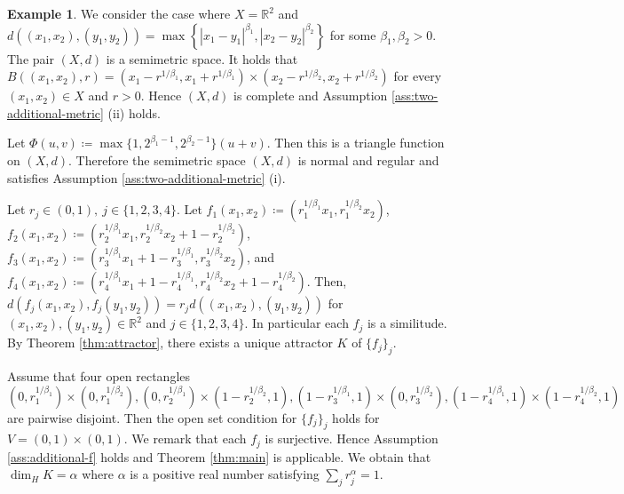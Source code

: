 \documentclass[a4paper, reqno, 11pt]{amsart}
\theoremstyle{definition}
\newtheorem{Exa}[Thm]{Example}
\begin{document}
\begin{Exa}
We consider the case where $X = \mathbb{R}^2$ and $d\left((x_1,x_2), (y_1, y_2)\right) = \max\left\{|x_1 - y_1|^{\beta_1},  |x_2 - y_2|^{\beta_2} \right\}$ for some $\beta_1, \beta_2 > 0$. 
The pair $(X,d)$ is a  semimetric space. 
It holds that $B\left((x_1,x_2),r \right) = \left(x_1-r^{1/\beta_1}, x_1+r^{1/\beta_1}\right) \times \left(x_2 - r^{1/\beta_2}, x_2 + r^{1/\beta_2} \right)$ for every $(x_1, x_2) \in X$ and $r > 0$.  
Hence $(X,d)$ is complete and Assumption \ref{ass:two-additional-metric} (ii) holds. 


Let $\Phi  (u,v) \coloneqq \max\{1,2^{\beta_1 - 1}, 2^{\beta_2 -1}\} (u+v)$. 
Then this is a triangle function on $(X,d)$. 
Therefore the semimetric space $(X,d)$ is normal and regular and satisfies Assumption \ref{ass:two-additional-metric} (i). 

Let $r_j \in (0,1), \ j \in \{1,2,3,4\}$. 
Let $f_1 (x_1, x_2) \coloneqq (r_{1}^{1/\beta_1} x_1, r_{1}^{1/\beta_2} x_2)$, $f_2 (x_1, x_2) \coloneqq (r_{2}^{1/\beta_1} x_1, r_{2}^{1/\beta_2} x_2 + 1 - r_{2}^{1/\beta_2})$,  $f_3 (x_1, x_2) \coloneqq (r_{3}^{1/\beta_1} x_1 + 1 - r_{3}^{1/\beta_1}, r_{3}^{1/\beta_2} x_2)$, and $f_4 (x_1, x_2) \coloneqq (r_{4}^{1/\beta_1} x_1 + 1 - r_{4}^{1/\beta_1}, r_{4}^{1/\beta_2} x_2 + 1 - r_{4}^{1/\beta_2})$. 
Then, $d(f_j (x_1, x_2), f_j (y_1, y_2)) = r_j d((x_1, x_2), (y_1, y_2))$ for $(x_1, x_2), (y_1, y_2) \in \mathbb{R}^2$ and $ j \in \{1,2,3,4\}$. 
In particular each $f_j$ is a similitude. 
By Theorem \ref{thm:attractor}, there exists a unique attractor $K$ of $\{f_j\}_j$. 

Assume that four open rectangles $(0,r_{1}^{1/\beta_1}) \times (0,r_{1}^{1/\beta_2}), (0,r_{2}^{1/\beta_1}) \times (1-r_{2}^{1/\beta_2},1), (1-r_{3}^{1/\beta_1},1) \times (0,r_{3}^{1/\beta_2}), (1-r_{4}^{1/\beta_1},1) \times (1-r_{4}^{1/\beta_2},1)$ are pairwise disjoint.
Then the open set condition for $\{f_j\}_j$ holds for $V = (0,1) \times (0,1)$. 
We remark that each $f_j$ is surjective. 
Hence Assumption \ref{ass:additional-f} holds and Theorem \ref{thm:main} is applicable. 
We obtain that $\dim_H K = \alpha$ where $\alpha$ is a positive real number satisfying $\sum_{j} r_j^{\alpha} = 1$. 
\end{Exa}
 



 
\end{document}
